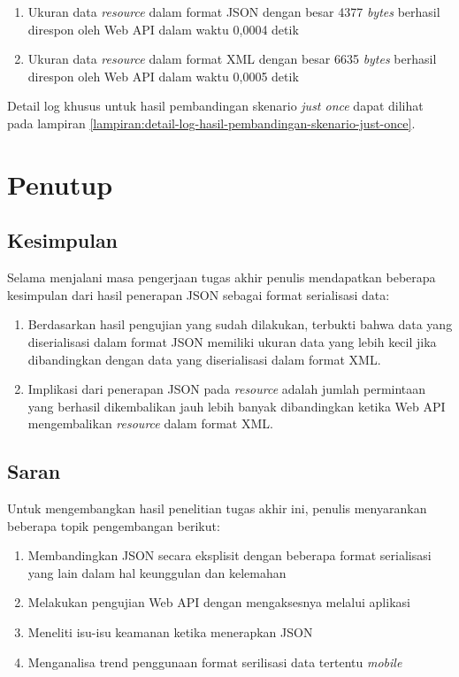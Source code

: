 \documentclass[a4paper, 12pt, oneside]{report}
\begin{document}
\begin{enumerate}
  \item Ukuran data \textit{resource} dalam format JSON dengan besar 4377 \textit{bytes} berhasil direspon oleh Web API dalam waktu 0,0004 detik
  \item Ukuran data \textit{resource} dalam format XML dengan besar 6635 \textit{bytes} berhasil direspon oleh Web API dalam waktu 0,0005 detik
\end{enumerate}

Detail log khusus untuk hasil pembandingan skenario \textit{just once} dapat dilihat pada lampiran \ref{lampiran:detail-log-hasil-pembandingan-skenario-just-once}.

\chapter{Penutup} \label{bab:6}

\section{Kesimpulan}

Selama menjalani masa pengerjaan tugas akhir penulis mendapatkan beberapa kesimpulan dari hasil penerapan JSON sebagai format serialisasi data:

\begin{enumerate}
  \item Berdasarkan hasil pengujian yang sudah dilakukan, terbukti bahwa data yang diserialisasi dalam format JSON memiliki ukuran data yang lebih kecil jika dibandingkan dengan data yang diserialisasi dalam format XML.
  \item Implikasi dari penerapan JSON pada \textit{resource} adalah jumlah permintaan yang berhasil dikembalikan jauh lebih banyak dibandingkan ketika Web API mengembalikan \textit{resource} dalam format XML.
\end{enumerate}

\section{Saran}

Untuk mengembangkan hasil penelitian tugas akhir ini, penulis menyarankan beberapa topik pengembangan berikut:

\begin{enumerate}
  \item Membandingkan JSON secara eksplisit dengan beberapa format serialisasi yang lain dalam hal keunggulan dan kelemahan
  \item Melakukan pengujian Web API dengan mengaksesnya melalui aplikasi
  \item Meneliti isu-isu keamanan ketika menerapkan JSON
  \item Menganalisa trend penggunaan format serilisasi data tertentu  
  \textit{mobile}
\end{enumerate}
\end{document}
